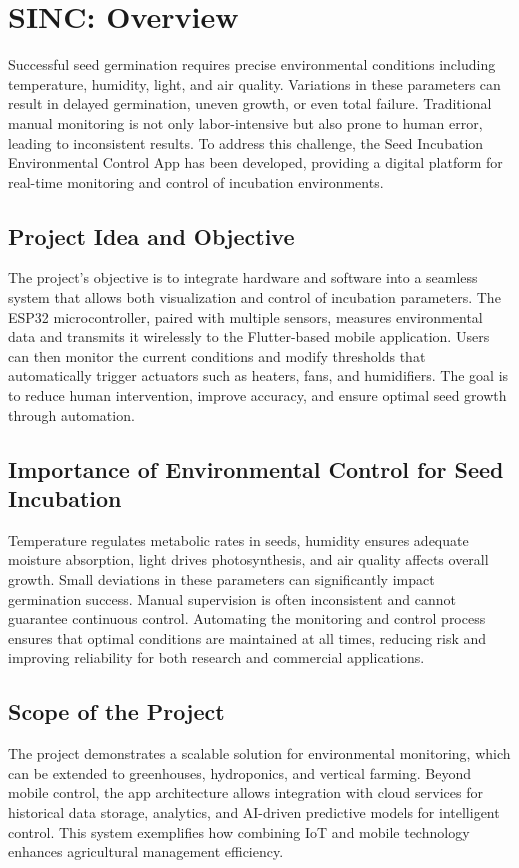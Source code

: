 \documentclass[../main]{subfiles}
\begin{document}
\chapter{SINC: Overview}

Successful seed germination requires precise environmental conditions including
temperature, humidity, light, and air quality. Variations in these parameters
can result in delayed germination, uneven growth, or even total failure.
Traditional manual monitoring is not only labor-intensive but also prone to
human error, leading to inconsistent results. To address this challenge, the
Seed Incubation Environmental Control App has been developed, providing a
digital platform for real-time monitoring and control of incubation
environments.

\section{Project Idea and Objective}

The project’s objective is to integrate hardware and software into a seamless
system that allows both visualization and control of incubation parameters. The
ESP32 microcontroller, paired with multiple sensors, measures environmental
data and transmits it wirelessly to the Flutter-based mobile application. Users
can then monitor the current conditions and modify thresholds that
automatically trigger actuators such as heaters, fans, and humidifiers. The
goal is to reduce human intervention, improve accuracy, and ensure optimal seed
growth through automation.

\section{Importance of Environmental Control for Seed Incubation}

Temperature regulates metabolic rates in seeds, humidity ensures adequate
moisture absorption, light drives photosynthesis, and air quality affects
overall growth. Small deviations in these parameters can significantly impact
germination success. Manual supervision is often inconsistent and cannot
guarantee continuous control. Automating the monitoring and control process
ensures that optimal conditions are maintained at all times, reducing risk and
improving reliability for both research and commercial applications.

\section{Scope of the Project}

The project demonstrates a scalable solution for environmental monitoring,
which can be extended to greenhouses, hydroponics, and vertical farming. Beyond
mobile control, the app architecture allows integration with cloud services for
historical data storage, analytics, and AI-driven predictive models for
intelligent control. This system exemplifies how combining IoT and mobile
technology enhances agricultural management efficiency.
\end{document}
